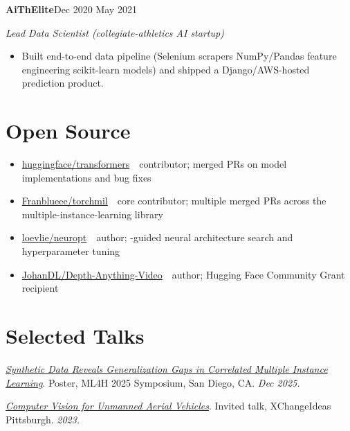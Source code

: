 \documentclass[10pt,letterpaper]{article}
\newcommand{\sansfam}{\sffamily}
\newcommand{\monofam}{\ttfamily}
\newcommand{\datestamp}[1]{{\sansfam\footnotesize\color{meta}\figureversion{lf}#1}}
\newcommand{\role}[2]{%
  \filbreak%
  \par\vspace{1pt}%
  \noindent\textbf{#1}\hfill\datestamp{#2}\par\nopagebreak}
\newcommand{\sub}[1]{\noindent\textit{\footnotesize\color{meta} #1}\par\nopagebreak}
\newcommand{\acro}[1]{\textls[80]{#1}}
\newenvironment{publist}{%
  \begin{list}{}{%
    \setlength{\leftmargin}{1.2em}%
    \setlength{\itemindent}{-1.2em}%
    \setlength{\itemsep}{2pt}%
    \setlength{\parsep}{0pt}%
    \setlength{\topsep}{1pt}%
  }%
}{\end{list}}
\begin{document}
\role{AiThElite}{Dec 2020 \textendash{} May 2021}
\sub{Lead Data Scientist (collegiate-athletics AI startup)}
\begin{itemize}
  \item Built end-to-end data pipeline (Selenium scrapers \textrightarrow{} NumPy/Pandas feature engineering \textrightarrow{} scikit-learn models) and shipped a Django/AWS-hosted prediction product.
\end{itemize}

\section{Open Source}

\begin{itemize}
  \item \href{https://github.com/huggingface/transformers}{\monofam huggingface/transformers} \,\textemdash\, contributor; merged PRs on model implementations and bug fixes
  \item \href{https://github.com/Franblueee/torchmil}{\monofam Franblueee/torchmil} \,\textemdash\, core contributor; multiple merged PRs across the multiple-instance-learning library
  \item \href{https://github.com/loevlie/neuropt}{\monofam loevlie/neuropt} \,\textemdash\, author; \acro{LLM}-guided neural architecture search and hyperparameter tuning
  \item \href{https://huggingface.co/spaces/JohanDL/Depth-Anything-Video}{\monofam JohanDL/Depth-Anything-Video} \,\textemdash\, author; Hugging Face Community Grant recipient
\end{itemize}

\section{Selected Talks}

\begin{publist}
\item \href{https://drive.google.com/file/d/1Z6lkTsqYSIzOqgM53qONW2riQhVM5R0W/view?usp=sharing}{\textit{Synthetic Data Reveals Generalization Gaps in Correlated Multiple Instance Learning}}. Poster, ML4H 2025 Symposium, San Diego, CA. \textit{Dec 2025.}

\item \href{https://xchangepgh2023.sched.com/event/1LdC7/an-interactive-exploration-of-computer-vision-for-unmanned-aerial-vehicles-uavs}{\textit{Computer Vision for Unmanned Aerial Vehicles}}. Invited talk, XChangeIdeas Pittsburgh. \textit{2023.}
\end{publist}
\end{document}
